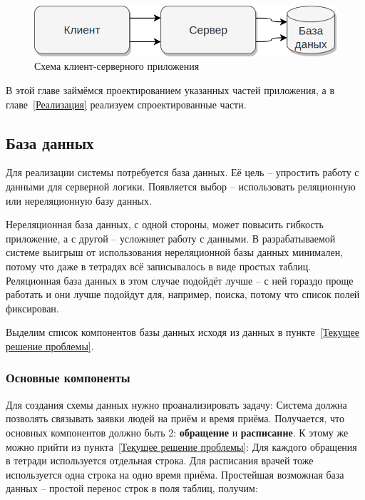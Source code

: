 \documentclass[a4paper,article]{article}
\begin{document}
\begin{sloppypar}
\begin{figure}[h]
        \centering

        \includegraphics[width=0.6\linewidth]{Схема клиент-серверного приложения.png}

        \caption{\centering Схема клиент-серверного приложения}

        \label{fig:Схема клиент-серверного приложения}

    \end{figure}

    В этой главе займёмся проектированием указанных частей приложения, а в главе~\ref{Реализация} реализуем спроектированные части.

    \subsection{База данных}

    Для реализации системы потребуется база данных. Её цель -- упростить работу с данными для серверной логики. Появляется выбор -- использовать реляционную или нереляционную базу данных.

    Нереляционная база данных, с одной стороны, может повысить гибкость приложение, а с другой -- усложняет работу с данными. В разрабатываемой системе выигрыш от использования нереляционной базы данных минимален, потому что даже в тетрадях всё записывалось в виде простых таблиц. Реляционная база данных в этом случае подойдёт лучше -- с ней гораздо проще работать и они лучше подойдут для, например, поиска, потому что список полей фиксирован.

    Выделим список компонентов базы данных исходя из данных в пункте~\ref{Текущее решение проблемы}.

    \subsubsection{Основные компоненты}\label{Проектирование БД. Основные компоненты}

    Для создания схемы данных нужно проанализировать задачу: Система должна позволять связывать заявки людей на приём и время приёма. Получается, что основных компонентов должно быть 2: \textbf{обращение} и \textbf{расписание}. К этому же можно прийти из пункта~\ref{Текущее решение проблемы}: Для каждого обращения в тетради используется отдельная строка. Для расписания врачей тоже используется одна строка на одно время приёма. Простейшая возможная база данных -- простой перенос строк в поля таблиц, получим:


\end{sloppypar}
\end{document}
